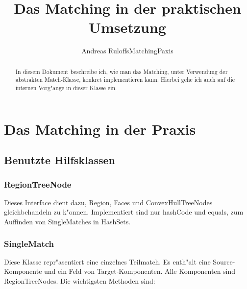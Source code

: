 \documentclass[a4paper,10pt,twoside]{scrreprt}
\title{Das Matching in der praktischen Umsetzung}
\author{Andreas RuloffsMatchingPaxis}
\begin{document}
\maketitle

\begin{abstract}
In diesem Dokument beschreibe ich, wie man das Matching, unter Verwendung der abstrakten Match-Klasse, konkret implementieren kann. Hierbei gehe ich auch auf die internen Vorg"ange in dieser Klasse ein.
\end{abstract}
\tableofcontents
\chapter{Das Matching in der Praxis}

\section{Benutzte Hilfsklassen}
\subsection{RegionTreeNode}

Dieses Interface dient dazu, Region, Faces und ConvexHullTreeNodes gleichbehandeln zu k"onnen. Implementiert sind nur hashCode und equals, zum Auffinden von SingleMatches in HashSets.

\subsection{SingleMatch}

Diese Klasse repr"asentiert eine einzelnes Teilmatch.  Es enth"alt eine Source-Komponente und ein Feld von Target-Komponenten. Alle Komponenten sind RegionTreeNodes.
Die wichtigsten Methoden sind:
\end{document}
